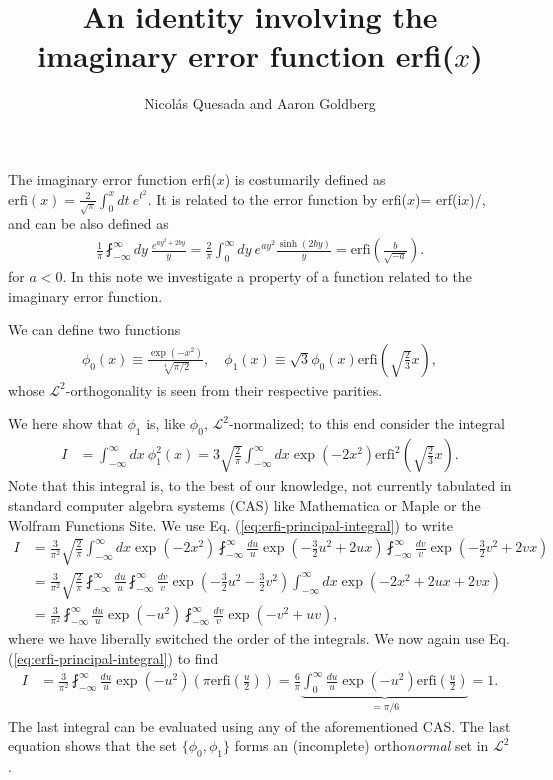 \documentclass[11pt,letterpaper]{article}
\title{An identity involving the imaginary error function erfi($x$)}
\author{Nicol\'as Quesada and Aaron Goldberg}
\date{}
\newcommand{\eq}[1]{\begin{align}#1\end{align}}
\newcommand{\erfi}{\text{erfi}}
\newcommand{\iu}{\text{i}}
\begin{document}
\maketitle
The imaginary error function erfi($x$) is costumarily defined as $\erfi(x) = \frac{2}{\sqrt{\pi}} \int_0^x dt \ e^{t^2}$.
It is related to the error function by erfi($x$)= erf($\iu x$)/\iu, and can be also defined as
\eq{
\frac{1}{\pi} \fint_{-\infty}^{\infty} dy\ \frac{e^{a y^2 +2 b y}}{ y} = \frac{2}{\pi}\int_0^\infty dy \ e^{a y^2}\frac{\sinh(2 b y)}{ y}=\erfi\left(\frac{b}{\sqrt{-a}}\right).
\label{eq:erfi-principal-integral}
}
for $a<0$. In this note we investigate a property of a function related to the imaginary error function.

We can define two functions
\eq{
  \phi_0(x)\equiv\frac{\exp\left(-x^2\right)}{\sqrt[4]{\pi/2}}, 
\quad   \phi_1(x)\equiv\sqrt{3}\phi_0\left(x\right)\erfi\left(\sqrt{\frac{2}{3}}x\right),
}
whose $\mathcal{L}^2$-orthogonality is seen from their respective parities. 

We here show that $\phi_1$ is, like $\phi_0$, $\mathcal{L}^2$-normalized; to this end consider the integral
\eq{
  I&=\int_{-\infty}^\infty dx \ \phi_1^2\left(x\right) =3\sqrt{\frac{2}{\pi}}\int_{-\infty}^\infty dx  \exp\left(-2x^2\right)\erfi^2\left(\sqrt{\frac{2}{3}}x\right).
}
Note that this integral is, to the best of our knowledge, not currently tabulated in standard computer algebra systems (CAS) like Mathematica or Maple or the Wolfram Functions Site. 
We use Eq. (\ref{eq:erfi-principal-integral}) to write
\begin{subequations}
\eq{
  I&=\frac{3}{\pi^2}\sqrt{\frac{2}{\pi}}\int_{-\infty}^\infty dx\exp\left(-2x^2\right)\fint_{-\infty}^\infty \frac{du}{u} \exp\left(-\frac{3}{2}u^2+2ux\right)\fint_{-\infty}^\infty \frac{dv}{v} \exp\left(-\frac{3}{2}v^2+2vx\right)\\
  &=\frac{3}{\pi^2}\sqrt{\frac{2}{\pi}}\fint_{-\infty}^\infty \frac{du}{u}\fint_{-\infty}^\infty \frac{dv}{v}
  \exp\left(-\frac{3}{2}u^2-\frac{3}{2}v^2\right) \int_{-\infty}^\infty dx \exp\left(-2x^2+2ux+2vx\right)\\
  &=\frac{3}{\pi^2}\fint_{-\infty}^\infty \frac{du}{u}\exp\left(-u^2\right)\fint_{-\infty}^\infty \frac{dv}{v}
  \exp\left(-v^2+uv\right),
}
\end{subequations}
where we have liberally switched the order of the integrals. We now again use Eq. (\ref{eq:erfi-principal-integral}) to find
\eq{
  I&=\frac{3}{\pi^2}\fint_{-\infty}^\infty \frac{du}{u}\exp\left(-u^2\right)\left(\pi\erfi\left(\frac{u}{2}\right)\right)=\frac{6}{\pi}\underbrace{\int_{0}^\infty \frac{du}{u}\exp\left(-u^2\right)\erfi\left(\frac{u}{2}\right)}_{=\pi/6}=1.
}
The last integral can be evaluated using any of the aforementioned CAS. The last equation shows that the set $\{\phi_0,\phi_1 \}$ forms an (incomplete) ortho\emph{normal} set in $\mathcal{L}^2$.
\end{document}
